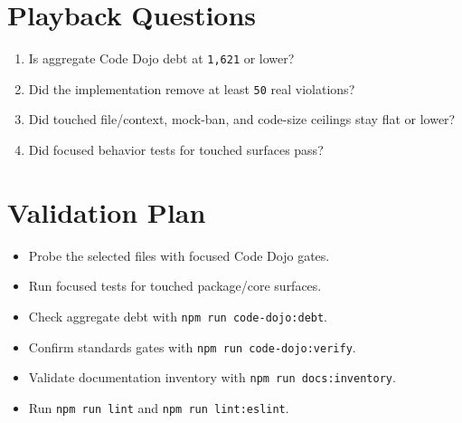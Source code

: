 \section{Playback Questions}\label{record-224-playback-questions}

\begin{enumerate}
\def\labelenumi{\arabic{enumi}.}
\tightlist
\item
  Is aggregate Code Dojo debt at \texttt{1\allowbreak{},\allowbreak{}6\allowbreak{}2\allowbreak{}1} or lower?
\item
  Did the implementation remove at least \texttt{5\allowbreak{}0} real violations?
\item
  Did touched file/context, mock-ban, and code-size ceilings stay flat or lower?
\item
  Did focused behavior tests for touched surfaces pass?
\end{enumerate}

\section{Validation Plan}\label{record-224-validation-plan}

\begin{itemize}
\tightlist
\item
  Probe the selected files with focused Code Dojo gates.
\item
  Run focused tests for touched package/core surfaces.
\item
  Check aggregate debt with \texttt{n\allowbreak{}p\allowbreak{}m\allowbreak{} \allowbreak{}r\allowbreak{}u\allowbreak{}n\allowbreak{} \allowbreak{}c\allowbreak{}o\allowbreak{}d\allowbreak{}e\allowbreak{}-\allowbreak{}d\allowbreak{}o\allowbreak{}j\allowbreak{}o\allowbreak{}:\allowbreak{}d\allowbreak{}e\allowbreak{}b\allowbreak{}t}.
\item
  Confirm standards gates with \texttt{n\allowbreak{}p\allowbreak{}m\allowbreak{} \allowbreak{}r\allowbreak{}u\allowbreak{}n\allowbreak{} \allowbreak{}c\allowbreak{}o\allowbreak{}d\allowbreak{}e\allowbreak{}-\allowbreak{}d\allowbreak{}o\allowbreak{}j\allowbreak{}o\allowbreak{}:\allowbreak{}v\allowbreak{}e\allowbreak{}r\allowbreak{}i\allowbreak{}f\allowbreak{}y}.
\item
  Validate documentation inventory with \texttt{n\allowbreak{}p\allowbreak{}m\allowbreak{} \allowbreak{}r\allowbreak{}u\allowbreak{}n\allowbreak{} \allowbreak{}d\allowbreak{}o\allowbreak{}c\allowbreak{}s\allowbreak{}:\allowbreak{}i\allowbreak{}n\allowbreak{}v\allowbreak{}e\allowbreak{}n\allowbreak{}t\allowbreak{}o\allowbreak{}r\allowbreak{}y}.
\item
  Run \texttt{n\allowbreak{}p\allowbreak{}m\allowbreak{} \allowbreak{}r\allowbreak{}u\allowbreak{}n\allowbreak{} \allowbreak{}l\allowbreak{}i\allowbreak{}n\allowbreak{}t} and \texttt{n\allowbreak{}p\allowbreak{}m\allowbreak{} \allowbreak{}r\allowbreak{}u\allowbreak{}n\allowbreak{} \allowbreak{}l\allowbreak{}i\allowbreak{}n\allowbreak{}t\allowbreak{}:\allowbreak{}e\allowbreak{}s\allowbreak{}l\allowbreak{}i\allowbreak{}n\allowbreak{}t}.
\end{itemize}

